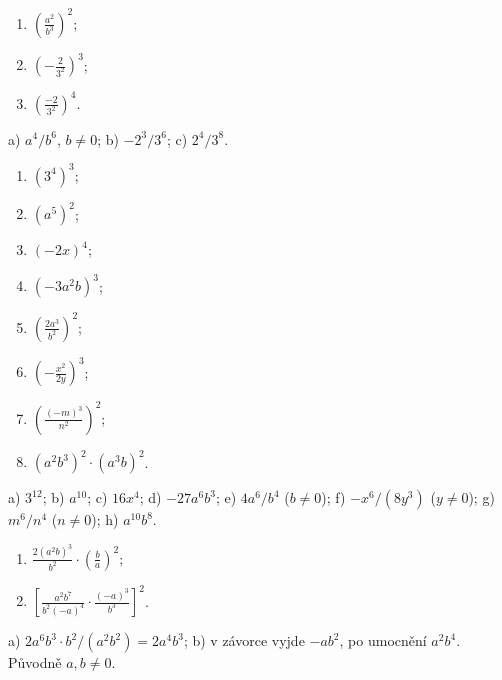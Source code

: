 \documentclass[11pt,a4paper]{article}
\begin{document}
\begin{prikladReseniBox}[title={Příklad 2},breakable=false]
\begin{enumerate}[label=\alph*)]
\item $\left(\frac{a^2}{b^3}\right)^2$;
\item $\left(-\frac{2}{3^2}\right)^3$;
\item $\left(\frac{-2}{3^2}\right)^4$.
\end{enumerate}
\tcblower
 a) $a^4/b^6$, $b\ne0$;
 b) $-2^3/3^6$; c) $2^4/3^8$.
\end{prikladReseniBox}
\begin{zadaniReseniBox}[title={Samostatná práce 2}]
\begin{enumerate}[label=\alph*)]
\item $(3^4)^3$; \item $(a^5)^2$; \item $(-2x)^4$;
\item $(-3a^2b)^3$; \item $\left(\frac{2a^3}{b^2}\right)^2$;
\item $\left(-\frac{x^2}{2y}\right)^3$;
\item $\left(\frac{(-m)^3}{n^2}\right)^2$;
\item $(a^2b^3)^2\cdot(a^3b)^2$.
\end{enumerate}
\tcblower
 a) $3^{12}$; b) $a^{10}$; c) $16x^4$;
 d) $-27a^6b^3$; e) $4a^6/b^4$ ($b\ne0$);
 f) $-x^6/(8y^3)$ ($y\ne0$);
 g) $m^6/n^4$ ($n\ne0$); h) $a^{10}b^8$.
\end{zadaniReseniBox}
\begin{zadaniReseniBox}[title={Rozšíření 2}]
\begin{enumerate}[label=\alph*)]
\item $\frac{2(a^2b)^3}{b^2}\cdot\left(\frac ba\right)^2$;
\item $\left[\frac{a^2b^7}{b^2(-a)^4}\cdot\frac{(-a)^3}{b^3}\right]^2$.
\end{enumerate}
\tcblower
 a) $2a^6b^3\cdot b^2/(a^2b^2)=\boxed{2a^4b^3}$;
 b) v závorce vyjde $-ab^2$, po umocnění $\boxed{a^2b^4}$.
Původně $a,b\ne0$.
\end{zadaniReseniBox}
\end{document}
